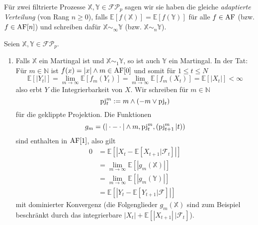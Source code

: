 \begin{definition}
Für zwei filtrierte Prozesse $\mathbb{X,Y} \in \mathcal{FP}_p$ sagen wir sie haben die gleiche \emph{adaptierte Verteilung} (von Rang $n\geq 0$), falls $\mathbb{E}[f(\mathbb{X})] = \mathbb{E}[f(\mathbb{Y})]$ für alle $f \in \operatorname{AF}$ (bzw. $f \in \operatorname{AF}[n]$) und schreiben dafür $\mathbb{X} \sim_\infty \mathbb{Y}$ (bzw. $\mathbb{X} \sim_n \mathbb{Y}$).
\end{definition}
\begin{example}
    Seien $\mathbb{X,Y} \in\mathcal{FP}_p$.
    \begin{enumerate}
        \item Falls $\mathbb{X}$ ein Martingal ist und $\mathbb{X}\sim_1 \mathbb{Y}$, so ist auch $\mathbb{Y}$ ein Martingal. In der Tat: Für $m \in \mathbb{N}$ ist $f(x)= |x| \wedge m \in \operatorname{AF}[0]$ und somit für $1\leq t \leq N$
        $$\mathbb{E}[|Y_t|] = \lim_{m\rightarrow\infty}\mathbb{E}[f_m(Y_t)]=\lim_{m\rightarrow\infty}\mathbb{E}[f_m(X_t)] = \mathbb{E}[|X_t|] < \infty$$
        also erbt $Y$ die Integrierbarkeit von $X$. Wir schreiben für $m \in \mathbb{N}$ 
        $$\operatorname{pj}_t^m:=m \wedge (-m \vee \operatorname{pj}_t)$$
         für die geklippte Projektion. Die Funktionen 
         $$g_m = (|\cdot - \cdot |\wedge m, \operatorname{pj}^m_t, (\operatorname{pj}^m_{t+1}\vert t))$$
         sind enthalten in $\operatorname{AF}[1]$, also gilt
         \begin{align*}
            0 &= \mathbb{E}\left[ |X_t - \mathbb{E}[X_{t+1} \vert \mathcal{F}_t]| \right] \\
            &= \lim_{m\rightarrow \infty} \mathbb{E}[|g_m(\mathbb{X})|] \\
            &= \lim_{m\rightarrow\infty} \mathbb{E}[|g_m(\mathbb{Y})|] \\
            &= \mathbb{E}\left[|Y_t - \mathbb{E}[Y_{t+1} \vert \mathcal{F}] |\right]
         \end{align*}
         mit dominierter Konvergenz (die Folgenglieder $g_m(\mathbb{X})$ sind zum Beispiel beschränkt durch das integrierbare $|X_t| + \mathbb{E}[|X_{t+1}| \,\vert \mathcal{F}_t]$).
    \end{enumerate}

\end{example}
